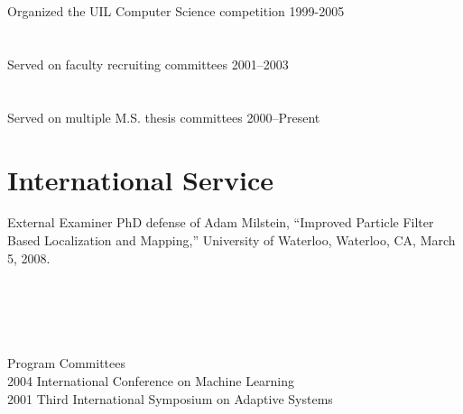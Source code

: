 \documentclass[12pt]{resume}
\begin{document}
\vspace*{-1.25\baselineskip}
\section{}{Organized the UIL Computer Science competition 1999-2005}{}

\vspace*{-1.25\baselineskip}
\section{}{Served on faculty recruiting committees 2001--2003}{}

\vspace*{-1.25\baselineskip}
\section{}{Served on multiple M.S. thesis committees 2000--Present}{}

\section{International Service}{External Examiner}
{
PhD defense of Adam Milstein, ``Improved Particle Filter Based Localization and Mapping,''
University of Waterloo, Waterloo, CA, March 5, 2008.
}

\section{\ }{Program Committees}
        {\\
2004 International Conference on Machine Learning\\
2001 Third International Symposium on Adaptive Systems \\
}
\end{document}
